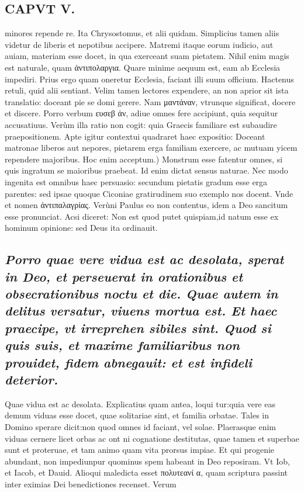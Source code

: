 \documentclass{article}
\begin{document}
\begin{pages}
\section*{CAPVT V. }
\marginpar{[ p.57 ]}\pstart minores repende re. Ita Chrysostomus, et alii quidam. Simplicius tamen aliis videtur de liberis et nepotibus accipere. Matremi itaque eorum iudicio, aut auiam, materiam esse docet, in qua exerceant suam pietatem. Nihil enim magis est naturale, quam ἀντιπολαργια. Quare minime aequum est, eam ab Ecclesia impediri. Prius ergo quam oneretur Ecclesia, faciant illi suum officium. Hactenus retuli, quid alii sentiant. Velim tamen lectores expendere, an non aprior sit ista translatio: doceant pie se domi gerere. Nam μαντάναν, vtrunque significat, docere et discere. Porro verbum ευσεβ ἀν, adiue omnes fere accipiunt, quia sequitur accusatiuus. Verùm illa ratio non cogit: quia Graecis familiare est subaudire praepositionem. Apte igitur contextui quadraret haec expositio: Doceant matronae liberos aut nepores, pietarem erga familiam exercere, ac mutuam yicem rependere majoribus.  \pend\pstart Hoc enim acceptum.) Monstrum esse fatentur omnes, si quis ingratum se maioribus praebeat. Id enim dictat sensus naturae. Nec modo ingenita est omnibus haec persuasio: secundum pietatis gradum esse erga parentes: sed ipsae quoque Ciconiae gratirudinem suo exemplo nos docent. Vnde et nomen ἀντιπαλαγρίας. Verùni Paulus eo non contentus, idem a Deo sancitum esse pronunciat. Acsi diceret: Non est quod putet quispiam,id natum esse ex hominum opinione: sed Deus ita ordinauit.  \pend
{}
{}
\subsection*{\textit{Porro quae vere vidua est ac desolata, sperat in Deo, et perseuerat in orationibus et obsecrationibus noctu et die. Quae autem in delitus versatur, viuens mortua est. Et haec praecipe, vt irreprehen sibiles sint. Quod si quis suis, et maxime familiaribus non prouidet, fidem abnegauit: et est infideli deterior. }}\pstart Quae vidua est ac desolata. Explicatius quam antea, loqui tur:quia vere eas demum viduas esse docet, quae solitariae sint, et familia orbatae. Tales in Domino sperare dicit:non quod omnes id faciant, vel solae. Plaerasque enim viduas cernere licet orbas ac ont ni cognatione destitutas, quae tamen et superbae sunt et proteruae, et tam animo quam vita prorsus impiae. Et qui progenie abundant, non impediunpur quominus spem habeant in Deo reposiram. Vt Iob, et Iacob, et Dauid. Alioqui maledicta esset πολυτεανί α, quam scriptura passint inter eximias Dei benedictiones recenset. Verum  \pend

\end{pages}
\end{document}
